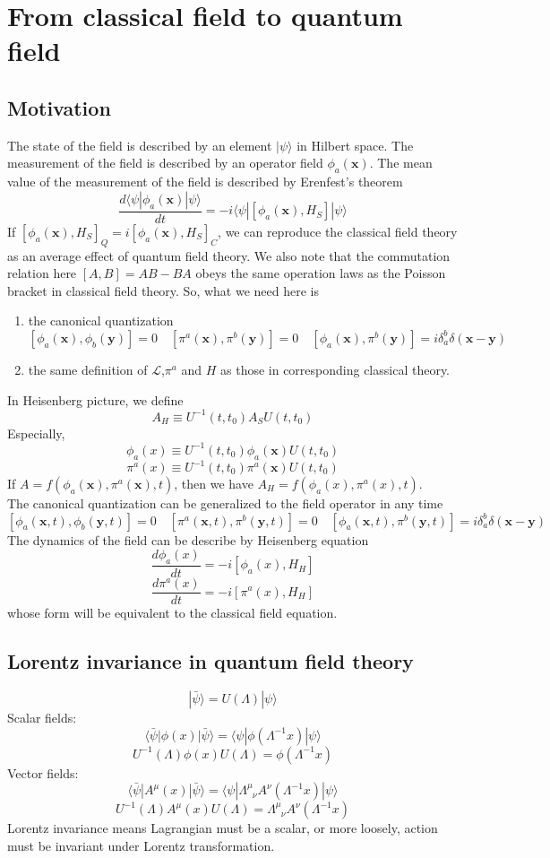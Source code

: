 \chapter{From classical field to quantum field}
\section{Motivation}
\noindent
The state of the field is described by an element $|\psi\rangle$ in Hilbert space. The measurement of the field is described by an operator field $\phi_a(\bm{x})$. The mean value of the measurement of the field is described by Erenfest's theorem
\[\frac{d\langle \psi| \phi_a(\bm{x}) | \psi \rangle}{dt} = -i \langle \psi | [\phi_a(\bm{x}),H_S] | \psi \rangle\]
If $[\phi_a(\bm{x}),H_S]_Q = i[\phi_a(\bm{x}),H_S]_C$, we can reproduce the classical field theory as an average effect of quantum field theory. We also note that the commutation relation here $[A,B] = AB - BA$ obeys the same operation laws as the Poisson bracket in classical field theory. So, what we need here is
\begin{enumerate}
\item the canonical quantization
\[[\phi_a(\bm{x}),\phi_b(\bm{y})] = 0 \quad [\pi^a(\bm{x}),\pi^b(\bm{y})] = 0 \quad [\phi_a(\bm{x}),\pi^b(\bm{y})] = i \delta_a^b \delta(\bm{x}-\bm{y}) \]
\item the same definition of $\mathcal{L}$,$\pi^a$ and $H$ as those in corresponding classical theory.
\end{enumerate}
In Heisenberg picture, we define
\[A_H \equiv U^{-1}(t,t_0) A_S U(t,t_0)\]
Especially,
\[\phi_a(x) \equiv U^{-1}(t,t_0) \phi_a(\bm{x}) U(t,t_0)\]
\[\pi^a(x) \equiv U^{-1}(t,t_0) \pi^a(\bm{x}) U(t,t_0)\]
If $A = f(\phi_a(\bm{x}),\pi^a(\bm{x}),t)$, then we have $A_H = f(\phi_a(x),\pi^a(x),t)$. \\
The canonical quantization can be generalized to the field operator in any time
\[[\phi_a(\bm{x},t),\phi_b(\bm{y},t)] = 0 \quad [\pi^a(\bm{x},t),\pi^b(\bm{y},t)] = 0 \quad [\phi_a(\bm{x},t),\pi^b(\bm{y},t)] = i \delta_a^b \delta(\bm{x}-\bm{y}) \]
The dynamics of the field can be describe by Heisenberg equation
\[\frac{d\phi_a(x)}{dt} = -i[\phi_a(x),H_H]\]
\[\frac{d\pi^a(x)}{dt} = -i[\pi^a(x),H_H]\]
whose form will be equivalent to the classical field equation.

\section{Lorentz invariance in quantum field theory}
\[| \bar{\psi}\rangle = U(\Lambda)| \psi\rangle\]
Scalar fields:
\[\langle \bar{\psi} | \phi(x) | \bar{\psi}\rangle = \langle \psi | \phi(\Lambda^{-1}x) | \psi\rangle\]
\[U^{-1}(\Lambda) \phi(x) U(\Lambda) = \phi(\Lambda^{-1}x)\]
Vector fields:
\[\langle \bar{\psi} | A^{\mu}(x) | \bar{\psi}\rangle = \langle \psi | \Lambda^{\mu}_{\phantom{\mu}\nu} A^{\nu}(\Lambda^{-1}x) | \psi\rangle\]
\[U^{-1}(\Lambda) A^{\mu}(x) U(\Lambda) = \Lambda^{\mu}_{\phantom{\mu}\nu} A^{\nu}(\Lambda^{-1}x)\]
Lorentz invariance means Lagrangian must be a scalar, or more loosely, action must be invariant under Lorentz transformation.

